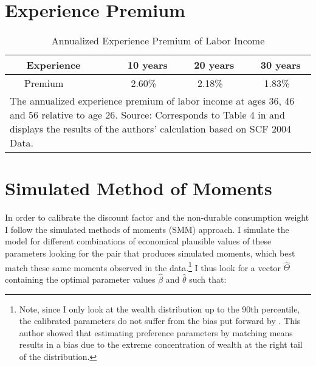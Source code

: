 \documentclass[a4paper,12pt,legno]{article}
\begin{document}
\newpage








\newpage{}
\appendix
\section{Experience Premium}
 \label{table_experience_premium}  


\begin{table}[!htbp]
\centering

\caption{Annualized Experience Premium of Labor Income}
\label{my-label}
\begin{tabular}{@{}llll@{}}
\toprule
 \ \ \ Experience \ \ & \ \ 10 years & \ \ 20 years & \ \ 30 years  \\ \midrule
  \ \ \ Premium \ \ & \ \ \ 2.60\%  & \ \ \ 2.18\%  & \ \ \ 1.83\% \\
\bottomrule
\multicolumn{4}{l}{%
  \begin{minipage}{9.5cm}%
\small The annualized experience premium of labor income at ages 36, 46 and 56 relative to age 26. Source: Corresponds to Table 4 in \cite{hintermaier2011} and displays the results of the authors' calculation based on SCF 2004 Data.
  \end{minipage}%
}\\
\end{tabular}
\end{table}

\section{Simulated Method of Moments}
\label{estimation_procedure}
In order to calibrate the discount factor and the non-durable consumption weight I follow the simulated methods of moments (SMM) approach. I simulate the model for different combinations of economical plausible values of these parameters looking for the pair that produces simulated moments, which best match these same moments observed in the data.\footnote{Note, since I only look at the wealth distribution up to the 90th percentile, the calibrated parameters do not suffer from the bias put forward by \cite{cagetti2003}. This author showed that estimating preference parameters by matching means results in a bias due to the extreme concentration of wealth at the right tail of the distribution.} I thus look for a vector $\hat{\Theta}$ containing the optimal parameter values $\hat{\beta}$ and $\hat{\theta}$ such that: 
\end{document}
